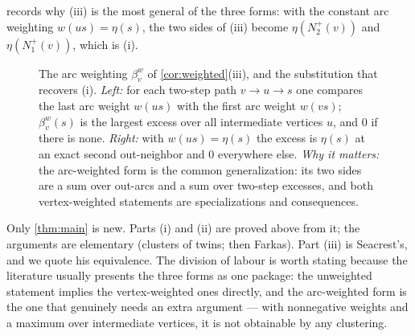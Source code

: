  records why (iii) is the most general of the three forms: with the constant arc
weighting $w(us)=\eta(s)$, the two sides of (iii) become $\eta(N_2^+(v))$ and $\eta(N_1^+(v))$, which
is (i).

\begin{figure}[t]
\centering

\caption{The arc weighting $\beta_v^w$ of \cref{cor:weighted}(iii), and the substitution that
 recovers (i). \emph{Left:} for each two-step path $v\to u\to s$ one compares the last arc weight
 $w(us)$ with the first arc weight $w(vs)$; $\beta_v^w(s)$ is the largest excess over all intermediate
 vertices $u$, and $0$ if there is none. \emph{Right:} with $w(us)=\eta(s)$ the excess is $\eta(s)$ at
 an exact second out-neighbor and $0$ everywhere else. \emph{Why it matters:} the arc-weighted form is
 the common generalization: its two sides are a sum over out-arcs and a sum over two-step excesses,
 and both vertex-weighted statements are specializations and consequences.}
\label{fig:beta}
\end{figure}

\begin{remark}\label{rem:quoted}
Only \cref{thm:main} is new. Parts (i) and (ii) are proved above from it; the arguments are
elementary (clusters of twins; then Farkas). Part (iii) is Seacrest's, and we quote his equivalence.
The division of labour is worth stating because the literature usually presents the three forms as
one package: the unweighted statement implies the vertex-weighted ones directly, and the arc-weighted
form is the one that genuinely needs an extra argument --- with nonnegative weights and a maximum over
intermediate vertices, it is not obtainable by any clustering.
\end{remark}
